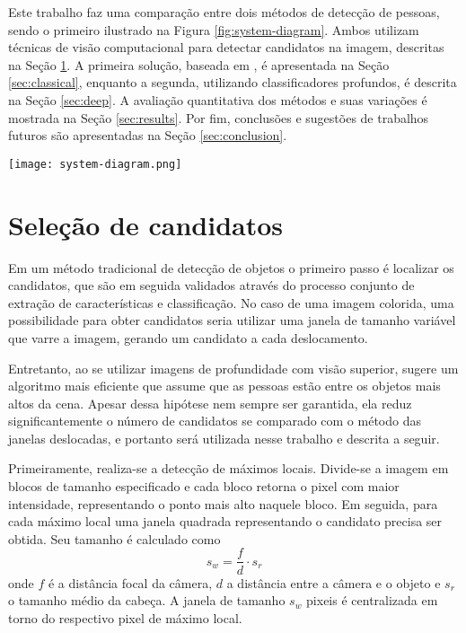  Este trabalho faz uma comparação entre dois métodos de detecção de pessoas, sendo o primeiro ilustrado na Figura \ref{fig:system-diagram}. Ambos utilizam técnicas de visão computacional para detectar candidatos na imagem, descritas na Seção \ref{sec:candidates}. A primeira solução, baseada em \cite{rauter}, é apresentada na Seção \ref{sec:classical}, enquanto a segunda, utilizando classificadores profundos, é descrita na Seção \ref{sec:deep}. A avaliação quantitativa dos métodos e suas variações é mostrada na Seção \ref{sec:results}. Por fim, conclusões e sugestões de trabalhos futuros são apresentadas na Seção \ref{sec:conclusion}.

  \begin{figure*}[!t]
  \centering
  \texttt{[image: system-diagram.png]}
  \caption{Diagrama do sistema de detecção de pessoas.}
  \label{fig:system-diagram}
  \end{figure*}

\section{Seleção de candidatos}
\label{sec:candidates}

    Em um método tradicional de detecção de objetos \cite{traditional-objdetect} o primeiro passo é localizar os candidatos, que são em seguida validados através do processo conjunto de extração de características e classificação. No caso de uma imagem colorida, uma possibilidade para obter candidatos seria utilizar uma janela de tamanho variável que varre a imagem, gerando um candidato a cada deslocamento.

    Entretanto, ao se utilizar imagens de profundidade com visão superior, \cite{rauter} sugere um algoritmo mais eficiente que assume que as pessoas estão entre os objetos mais altos da cena. Apesar dessa hipótese nem sempre ser garantida, ela reduz significantemente o número de candidatos se comparado com o método das janelas deslocadas, e portanto será utilizada nesse trabalho e descrita a seguir.

    Primeiramente, realiza-se a detecção de máximos locais. Divide-se a imagem em blocos de tamanho especificado e cada bloco retorna o pixel com maior intensidade, representando o ponto mais alto naquele bloco. Em seguida, para cada máximo local uma janela quadrada representando o candidato precisa ser obtida. Seu tamanho é calculado como
    \begin{equation}
      s_w = \frac{f}{d} \cdot s_r
    \end{equation}
    onde $f$ é a distância focal da câmera, $d$ a distância entre a câmera e o objeto e $s_r$ o tamanho médio da cabeça. A janela de tamanho $s_w$ pixeis é centralizada em torno do respectivo pixel de máximo local.


